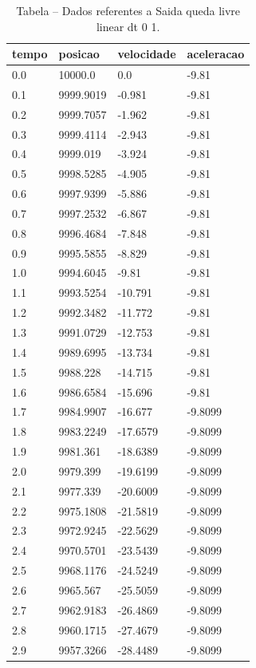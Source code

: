 \begin{table}[H]
\centering
\caption{Tabela – Dados referentes a Saida queda livre linear dt 0 1.}
\label{tab:saida_queda_livre_linear_dt_0_1}
\begin{tabular}{llll}
\toprule
tempo & posicao & velocidade & aceleracao \\
\midrule
0.0 & 10000.0 & 0.0 & -9.81 \\
0.1 & 9999.9019 & -0.981 & -9.81 \\
0.2 & 9999.7057 & -1.962 & -9.81 \\
0.3 & 9999.4114 & -2.943 & -9.81 \\
0.4 & 9999.019 & -3.924 & -9.81 \\
0.5 & 9998.5285 & -4.905 & -9.81 \\
0.6 & 9997.9399 & -5.886 & -9.81 \\
0.7 & 9997.2532 & -6.867 & -9.81 \\
0.8 & 9996.4684 & -7.848 & -9.81 \\
0.9 & 9995.5855 & -8.829 & -9.81 \\
1.0 & 9994.6045 & -9.81 & -9.81 \\
1.1 & 9993.5254 & -10.791 & -9.81 \\
1.2 & 9992.3482 & -11.772 & -9.81 \\
1.3 & 9991.0729 & -12.753 & -9.81 \\
1.4 & 9989.6995 & -13.734 & -9.81 \\
1.5 & 9988.228 & -14.715 & -9.81 \\
1.6 & 9986.6584 & -15.696 & -9.81 \\
1.7 & 9984.9907 & -16.677 & -9.8099 \\
1.8 & 9983.2249 & -17.6579 & -9.8099 \\
1.9 & 9981.361 & -18.6389 & -9.8099 \\
2.0 & 9979.399 & -19.6199 & -9.8099 \\
2.1 & 9977.339 & -20.6009 & -9.8099 \\
2.2 & 9975.1808 & -21.5819 & -9.8099 \\
2.3 & 9972.9245 & -22.5629 & -9.8099 \\
2.4 & 9970.5701 & -23.5439 & -9.8099 \\
2.5 & 9968.1176 & -24.5249 & -9.8099 \\
2.6 & 9965.567 & -25.5059 & -9.8099 \\
2.7 & 9962.9183 & -26.4869 & -9.8099 \\
2.8 & 9960.1715 & -27.4679 & -9.8099 \\
2.9 & 9957.3266 & -28.4489 & -9.8099 \\

\end{tabular}
\end{table}
